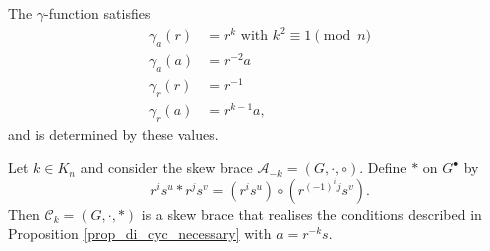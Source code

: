 \documentclass[10pt,a4paper]{amsart}
\begin{document}
\begin{proposition} \label{prop_di_cyc_necessary}
The $ \gamma $-function satisfies
\begin{align*}
\gamma_{a}(r) &= r^{k} \mbox{ with } k^{2} \equiv 1 \pmod{n} \\
\gamma_{a}(a) &= r^{-2}a \\
\gamma_{r}(r) &= r^{-1} \\
\gamma_{r}(a) &= r^{k-1}a,
\end{align*}
and is determined by these values. 
\end{proposition}

\begin{proposition} \label{prop_di_cyc_realise}
Let $ k \in K_{n} $ and consider the skew brace $ \mathscr{A}_{-k} = (G,\cdot,\circ) $. Define $ \ast  $ on $ G^{\bullet} $ by
\[ r^{i}s^{u} \ast r^{j}s^{v} = \left( r^{i}s^{u} \right) \circ \left( r^{(-1)^{i}j}s^{v} \right). \]
Then $ \mathscr{C}_{k} = (G,\cdot,\ast) $ is a skew brace that realises the conditions described in Proposition \ref{prop_di_cyc_necessary} with $ a=r^{-k}s $. 
\end{proposition}
\end{document}
